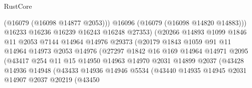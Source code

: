 \begin{lexlean}{RustCore}
\begin{coremodule}
                                    (@16079 (@16098 @14877 @2053)))
                                  @16096
                                  (@16079 (@16098 @14820 @14883)))
                                @16233
                                @16236
                                @16239
                                @16243
                                @16248
                                @27353)
                              (@20266
                                @14893
                                @1099
                                @1846
                                @11
                                @2053
                                @7144
                                @14964
                                @14976
                                @29373
                                (@20179
                                  @1843
                                  @1059
                                  @91
                                  @11
                                  @14964
                                  @14973
                                  @2053
                                  @14976
                                  (@27297
                                    @1842
                                    @16
                                    @169
                                    @14964
                                    @14971
                                    @2095
                                    (@43417
                                      @254
                                      @11
                                      @15
                                      @14950
                                      @14963
                                      @14970
                                      @2031
                                      @14899
                                      @2037
                                      (@43428
                                        @14936
                                        @14948
                                        (@43433
                                          @14936
                                          @14946
                                          @5534
                                          (@43440
                                            @14935
                                            @14945
                                            @2031
                                            @14907
                                            @2037
                                            @20219
                                            (@43450

\end{coremodule}
\end{lexlean}
